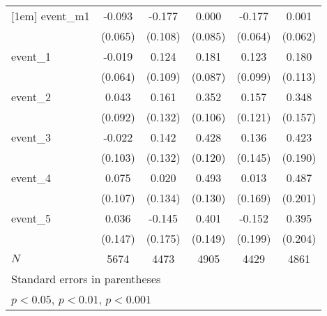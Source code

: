 {\begin{tabular}{l*{5}{c}}
[1em]
event\_m1    &      -0.093         &      -0.177         &       0.000         &      -0.177\sym{**} &       0.001         \\
            &     (0.065)         &     (0.108)         &     (0.085)         &     (0.064)         &     (0.062)         \\
[1em]
event\_1     &      -0.019         &       0.124         &       0.181\sym{*}  &       0.123         &       0.180         \\
            &     (0.064)         &     (0.109)         &     (0.087)         &     (0.099)         &     (0.113)         \\
[1em]
event\_2     &       0.043         &       0.161         &       0.352\sym{***}&       0.157         &       0.348\sym{*}  \\
            &     (0.092)         &     (0.132)         &     (0.106)         &     (0.121)         &     (0.157)         \\
[1em]
event\_3     &      -0.022         &       0.142         &       0.428\sym{***}&       0.136         &       0.423\sym{*}  \\
            &     (0.103)         &     (0.132)         &     (0.120)         &     (0.145)         &     (0.190)         \\
[1em]
event\_4     &       0.075         &       0.020         &       0.493\sym{***}&       0.013         &       0.487\sym{*}  \\
            &     (0.107)         &     (0.134)         &     (0.130)         &     (0.169)         &     (0.201)         \\
[1em]
event\_5     &       0.036         &      -0.145         &       0.401\sym{**} &      -0.152         &       0.395         \\
            &     (0.147)         &     (0.175)         &     (0.149)         &     (0.199)         &     (0.204)         \\
\hline
\(N\)       &        5674         &        4473         &        4905         &        4429         &        4861         \\
\hline\hline
\multicolumn{6}{l}{\footnotesize Standard errors in parentheses}\\
\multicolumn{6}{l}{\footnotesize \sym{*} \(p<0.05\), \sym{**} \(p<0.01\), \sym{***} \(p<0.001\)}\\
\end{tabular}
}

